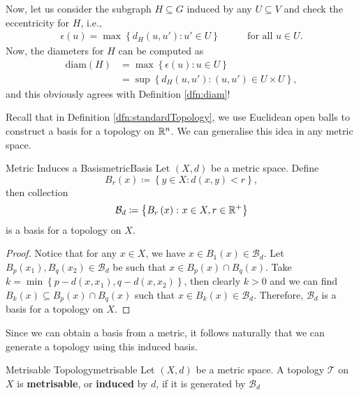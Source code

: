 \documentclass[math, code]{amznotes}
\theoremstyle{remark}
\begin{document}
Now, let us consider the subgraph $H \subseteq G$ induced by any $U \subseteq V$ and check the eccentricity for $H$, i.e.,
\begin{align*}
    \epsilon\left(u\right) = \max\left\{d_H\left(u, u'\right) \colon u' \in U\right\} & \qquad\textrm{for all } u \in U.
\end{align*}
Now, the diameters for $H$ can be computed as 
\begin{align*}
    \mathrm{diam}\left(H\right) & = \max\left\{\epsilon\left(u\right) \colon u \in U\right\} \\
    & = \sup\left\{d_H\left(u, u'\right) \colon \left(u, u'\right) \in U \times U\right\},
\end{align*}
and this obviously agrees with Definition \ref{dfn:diam}!

Recall that in Definition \ref{dfn:standardTopology}, we use Euclidean open balls to construct a basis for a topology on $\mathbb{R}^n$. We can generalise this idea in any metric space.
\begin{probox}{Metric Induces a Basis}{metricBasis}
    Let $\left(X, d\right)$ be a metric space. Define 
    \begin{equation*}
        B_r\left(x\right) \coloneqq \left\{y \in X \colon d\left(x, y\right) < r\right\},
    \end{equation*}
    then collection
    \begin{equation*}
        \mathcal{B}_d \coloneqq \left\{B_r\left(x\right) \colon x \in X, r \in \mathbb{R}^+\right\}
    \end{equation*}
    is a basis for a topology on $X$.
    \tcblower
    \begin{proof}
        Notice that for any $x \in X$, we have $x \in B_1\left(x\right) \in \mathcal{B}_d$. Let $B_p\left(x_1\right), B_q\left(x_2\right) \in \mathcal{B}_d$ be such that $x \in B_p\left(x\right) \cap B_q\left(x\right)$. Take $k = \min\left\{p - d\left(x, x_1\right), q - d\left(x, x_2\right)\right\}$, then clearly $k > 0$ and we can find $B_k\left(x\right) \subseteq B_p\left(x\right) \cap B_q\left(x\right)$ such that $x \in B_k\left(x\right) \in \mathcal{B}_d$. Therefore, $\mathcal{B}_d$ is a basis for a topology on $X$.
    \end{proof}
\end{probox}
Since we can obtain a basis from a metric, it follows naturally that we can generate a topology using this induced basis.
\begin{dfnbox}{Metrisable Topology}{metrisable}
    Let $\left(X, d\right)$ be a metric space. A topology $\mathcal{T}$ on $X$ is {\color{red} \textbf{metrisable}}, or {\color{red} \textbf{induced}} by $d$, if it is generated by $\mathcal{B}_d$
\end{dfnbox}
\end{document}
